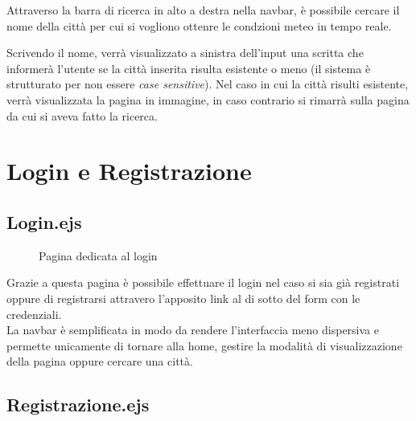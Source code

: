 Attraverso la barra di ricerca in alto a destra nella navbar, è possibile cercare il nome della città per cui si 
vogliono ottenre le condzioni meteo in tempo reale.\\

\vspace{5mm}

Scrivendo il nome, verrà visualizzato a sinistra dell'input una scritta che informerà l'utente se la città inserita 
risulta esistente o meno (il sistema è strutturato per non essere \emph{case sensitive}). Nel caso in cui la città risulti 
esistente, verrà visualizzata la pagina in immagine, in caso contrario si rimarrà sulla pagina da cui si aveva fatto la ricerca.

\section{Login e Registrazione}

\subsection{Login.ejs}

\begin{figure}[ht]
    \centering
    \caption{Pagina dedicata al login}
\end{figure}

Grazie a questa pagina è possibile effettuare il login nel caso si sia già registrati oppure di registrarsi attravero l'apposito 
link al di sotto del form con le credenziali.\\
La navbar è semplificata in modo da rendere l'interfaccia meno dispersiva e permette unicamente di tornare alla home, gestire 
la modalità di visualizzazione della pagina oppure cercare una città.

\newpage
\subsection{Registrazione.ejs}

